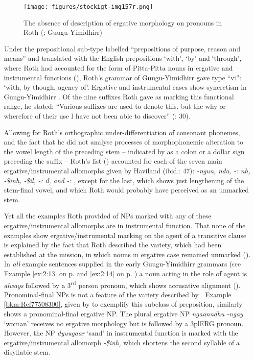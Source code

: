 \begin{figure}
\texttt{[image: figures/stockigt-img157r.png]}
\caption{The absence of description of ergative morphology on pronouns in Roth (\citeyear[30]{roth_structure_1901}; Guugu-Yimidhirr)}
\label{bkm:Ref465081962}
\label{fig:key:10-157}
\label{fig:key:10-213}
\label{fig:10:213}
\label{fig:key:213}
\end{figure}

Under the prepositional sub-type labelled ``prepositions of purpose, reason and means'' and translated with the English prepositions `with', `by' and `through', where Roth had accounted for the form of Pitta-Pitta nouns in ergative and instrumental functions (), Roth’s grammar of Guugu-Yimidhirr gave type ``vi'': `with, by though, agency of'. Ergative and instrumental cases show syncretism in Guugu-Yimidhirr \citep[47]{haviland_guugu_1979}. Of the nine suffixes Roth gave as marking this functional range, he stated: “Various suffixes are used to denote this, but the why or wherefore of their use I have not been able to discover” (\citealt{roth_structure_1901}: 30).

\hspace*{-5pt}Allowing for Roth’s orthographic under-differentiation of consonant phonemes, and the fact that he did not analyse processes of morphophonemic alteration to the vowel length of the preceding stem – indicated by \citet[48]{haviland_guugu_1979} as a colon or a dollar sign preceding the suffix – Roth’s list () accounted for each of the seven main ergative/instrumental allomorphs given by Haviland (ibid.: 47): \textit{{}-ngun, nda, -: nh, -\$inh, -\$il, -: il,} \textit{and -: ,} except for the last, which shows just lengthening of the stem-final vowel, and which Roth would probably have perceived as an unmarked stem.

Yet all the examples Roth provided of NPs marked with any of these ergative/instrumental allomorphs are in instrumental function. That none of the examples show ergative/instrumental marking on the agent of a transitive clause is explained by the fact that Roth described the variety, which had been established at the mission, in which nouns in ergative case remained unmarked (). In \textit{all} example sentences supplied in the early Guugu-Yimidhirr grammars (see Example \ref{ex:2:13} on p. \pageref{ex:2:13} and \ref{ex:2:14} on p. \pageref{ex:2:14}) a noun acting in the role of agent is \textit{always} followed by a 3\textsuperscript{rd} person pronoun, which shows accusative alignment (). Pronominal-final NPs is not a feature of the variety described by \citet{haviland_guugu_1979}. Example \ref{bkm:Ref77508300}, given by \citet[30]{roth_structure_1901} to exemplify this subclass of preposition, similarly shows a pronominal-final ergative NP. The plural ergative NP \textit{ngaanndhu -ngay} `woman' receives no ergative morphology but is followed by a 3plERG pronoun. However, the NP \textit{dyuugaar} `sand' in instrumental function is marked with the ergative/instrumental allomorph \textit{{}-\$inh,} which shortens the second syllable of a disyllabic stem.

